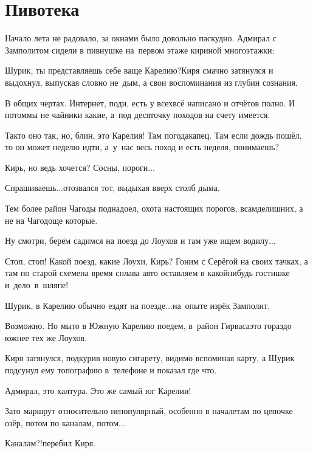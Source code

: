 \chapter{Пивотека}
\vepsianrose

Начало лета не радовало, за окнами было довольно паскудно. Адмирал с Замполитом сидели в пивнушке на~первом этаже кириной многоэтажки:

\diagdash Шурик, ты представляешь себе ваще Карелию?\mdash Киря смачно затянулся и выдохнул, выпуская словно не~дым, а свои воспоминания из глубин сознания.

\diagdash В общих чертах. Интернет, поди, есть у всех\mdash всё написано и отчётов полно. И потом\mdash мы не чайники какие, а~под десяточку походов на счету имеется. %

\diagdash Так\sdash то оно так, но, блин, это Карелия! Там погода\mdash капец. Там если дождь пошёл, то он может неделю идти, а~у~нас весь поход и есть неделя, понимаешь?

\diagdash Кирь, но ведь хочется? Сосны, пороги$\ldots$

\diagdash Спрашиваешь$\ldots$\mdash отозвался тот, выдыхая вверх столб дыма.

\diagdash Тем более район Чагоды поднадоел, охота настоящих порогов, всамделишних, а не на Чагодоще которые.

\diagdash Ну смотри, берём садимся на поезд до Лоухов и там уже ищем водилу$\ldots$

\diagdash Стоп, стоп! Какой поезд, какие Лоухи, Кирь? Гоним с Серёгой на своих тачках, а там по старой схеме\mdash на время сплава авто оставляем в какой\sdash нибудь гостишке и~дело~в~шляпе!

\diagdash Шурик, в Карелию обычно ездят на поезде$\ldots$\mdash на~опыте изрёк Замполит.

\diagdash Возможно. Но мы\sdash то в Южную Карелию поедем, в~район Гирваса\mdash это гораздо южнее тех же Лоухов.

Киря затянулся, подкурив новую сигарету, видимо вспоминая карту, а Шурик подсунул ему топографию в~телефоне и показал где что.

\diagdash Адмирал, это халтура. Это же самый юг Карелии!

\diagdash Зато маршрут относительно непопулярный, особенно в начале\mdash там по цепочке озёр, потом по каналам, потом$\ldots$

\diagdash Каналам?!\mdash перебил Киря.

